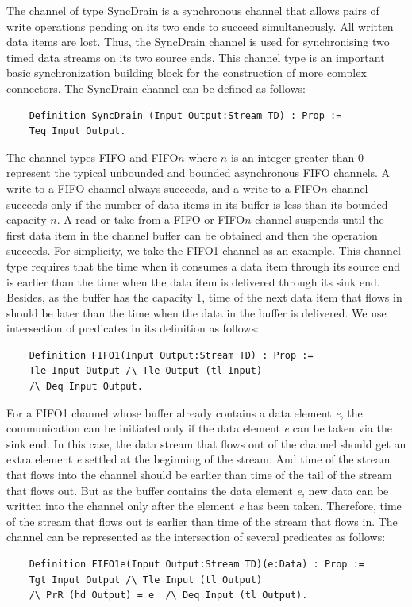 \documentclass{llncs}
\begin{document}
The channel of type SyncDrain is a synchronous channel that allows pairs of write operations pending on its two ends to succeed simultaneously. All written data items are lost. Thus, the SyncDrain channel is used for synchronising two timed data streams on its two source ends. This channel type is an important basic synchronization building block for the construction of more complex connectors. The SyncDrain channel can be defined as follows:
\begin{verbatim}
    Definition SyncDrain (Input Output:Stream TD) : Prop :=
    Teq Input Output.
\end{verbatim}


The channel types FIFO and FIFO$n$ where $n$ is an integer greater than $0$ represent the
typical unbounded and bounded asynchronous FIFO channels. A write to a FIFO channel always succeeds, and a write to a FIFO$n$ channel succeeds only if the
number of data items in its buffer is less than its bounded capacity $n$. A read or take from a FIFO or FIFO$n$ channel suspends until the first data item
in the channel buffer can be obtained and then the operation succeeds.
For simplicity, we take the FIFO1 channel as an example. This channel type requires that the time when it consumes a data item through its source end is earlier than the time when the data item is delivered through its sink end. Besides, as the buffer has the capacity 1, time of the next data item that flows in should be later than the time when the data in the buffer is delivered. We use intersection of predicates in its definition as follows:
\begin{verbatim}
    Definition FIFO1(Input Output:Stream TD) : Prop :=
    Tle Input Output /\ Tle Output (tl Input)
    /\ Deq Input Output.
\end{verbatim}

For a FIFO1 channel whose buffer already contains a data element \emph{e}, the communication can be initiated only if the data element \emph{e} can be taken via the sink end. In this case, the data stream that flows out of the channel should get an extra element \emph{e} settled at the beginning of the stream. And time of the stream that flows into the channel should be earlier than time of the tail of the stream that flows out. But as the buffer contains the data element \emph{e}, new data can be written into the channel only after the element \emph{e} has been taken. Therefore, time of the stream that flows out is earlier than time of the stream that flows in. The channel can be represented as the intersection of several predicates as follows:
\begin{verbatim}
    Definition FIFO1e(Input Output:Stream TD)(e:Data) : Prop :=
    Tgt Input Output /\ Tle Input (tl Output)
    /\ PrR (hd Output) = e  /\ Deq Input (tl Output).
\end{verbatim}
\end{document}
